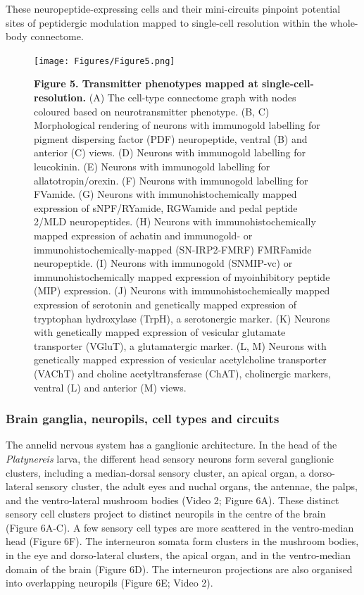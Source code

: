 \documentclass[
  11pt,
]{article}
\begin{document}
These neuropeptide-expressing cells and their mini-circuits pinpoint
potential sites of peptidergic modulation mapped to single-cell
resolution within the whole-body connectome.

\begin{figure}[H]

{\centering \texttt{[image: Figures/Figure5.png]}

}

\caption{\textbf{Figure 5. Transmitter phenotypes mapped at
single-cell-resolution. } (A) The cell-type connectome graph with nodes
coloured based on neurotransmitter phenotype. (B, C) Morphological
rendering of neurons with immunogold labelling for pigment dispersing
factor (PDF) neuropeptide, ventral (B) and anterior (C) views. (D)
Neurons with immunogold labelling for leucokinin. (E) Neurons with
immunogold labelling for allatotropin/orexin. (F) Neurons with
immunogold labelling for FVamide. (G) Neurons with immunohistochemically
mapped expression of sNPF/RYamide, RGWamide and pedal peptide 2/MLD
neuropeptides. (H) Neurons with immunohistochemically mapped expression
of achatin and immunogold- or immunohistochemically-mapped
(SN-IRP2-FMRF) FMRFamide neuropeptide. (I) Neurons with immunogold
(SNMIP-vc) or immunohistochemically mapped expression of myoinhibitory
peptide (MIP) expression. (J) Neurons with immunohistochemically mapped
expression of serotonin and genetically mapped expression of tryptophan
hydroxylase (TrpH), a serotonergic marker. (K) Neurons with genetically
mapped expression of vesicular glutamate transporter (VGluT), a
glutamatergic marker. (L, M) Neurons with genetically mapped expression
of vesicular acetylcholine transporter (VAChT) and choline
acetyltransferase (ChAT), cholinergic markers, ventral (L) and anterior
(M) views.}

\end{figure}%

\subsubsection{Brain ganglia, neuropils, cell types and
circuits}\label{brain-ganglia-neuropils-cell-types-and-circuits}

The annelid nervous system has a ganglionic architecture. In the head of
the \emph{Platynereis} larva, the different head sensory neurons form
several ganglionic clusters, including a median-dorsal sensory cluster,
an apical organ, a dorso-lateral sensory cluster, the adult eyes and
nuchal organs, the antennae, the palps, and the ventro-lateral mushroom
bodies (Video 2; Figure 6A). These distinct sensory cell clusters
project to distinct neuropils in the centre of the brain (Figure 6A-C).
A few sensory cell types are more scattered in the ventro-median head
(Figure 6F). The interneuron somata form clusters in the mushroom
bodies, in the eye and dorso-lateral clusters, the apical organ, and in
the ventro-median domain of the brain (Figure 6D). The interneuron
projections are also organised into overlapping neuropils (Figure 6E;
Video 2).
\end{document}
